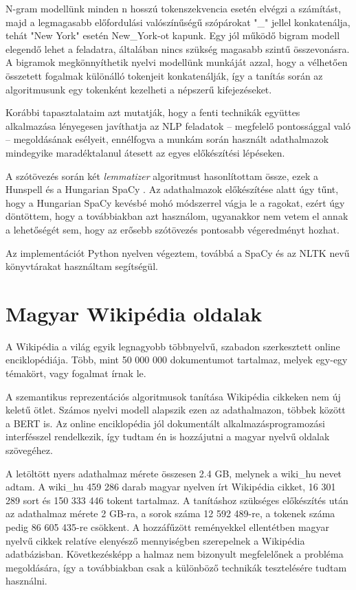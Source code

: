 N-gram modellünk minden n hosszú tokenszekvencia esetén elvégzi a számítást, majd a legmagasabb előfordulási valószínűségű szópárokat "\_" jellel konkatenálja, tehát "New York" esetén New\_York-ot kapunk. Egy jól működő bigram modell elegendő lehet a feladatra, általában nincs szükség magasabb szintű összevonásra. A bigramok megkönnyíthetik nyelvi modellünk munkáját azzal, hogy a vélhetően összetett fogalmak különálló tokenjeit konkatenálják, így a tanítás során az algoritmusunk egy tokenként kezelheti a népszerű kifejezéseket.

Korábbi tapasztalataim azt mutatják, hogy a fenti technikák együttes alkalmazása lényegesen javíthatja az NLP feladatok – megfelelő pontossággal való – megoldásának esélyeit, ennélfogva a munkám során használt adathalmazok mindegyike maradéktalanul átesett az egyes előkészítési lépéseken.

A szótövezés során két \textit{lemmatizer} algoritmust hasonlítottam össze, ezek a Hunspell \cite{hunspell} és a Hungarian SpaCy \cite{hunspacy}. Az adathalmazok előkészítése alatt úgy tűnt, hogy a Hungarian SpaCy kevésbé mohó módszerrel vágja le a ragokat, ezért úgy döntöttem, hogy a továbbiakban azt használom, ugyanakkor nem vetem el annak a lehetőségét sem, hogy az erősebb szótövezés pontosabb végeredményt hozhat. 

Az implementációt Python nyelven végeztem, továbbá a SpaCy \cite{spacy} és az NLTK \cite{nltk} nevű könyvtárakat használtam segítségül.

\section{Magyar Wikipédia oldalak}
A Wikipédia \cite{wikipedia} a világ egyik legnagyobb többnyelvű, szabadon szerkesztett online enciklopédiája. Több, mint 50 000 000 dokumentumot tartalmaz, melyek egy-egy témakört, vagy fogalmat írnak le.

A szemantikus reprezentációs algoritmusok tanítása Wikipédia cikkeken nem új keletű ötlet. Számos nyelvi modell alapszik ezen az adathalmazon, többek között a BERT is.
Az online enciklopédia jól dokumentált alkalmazásprogramozási interfésszel rendelkezik, így tudtam én is hozzájutni a magyar nyelvű oldalak szövegéhez.

A letöltött nyers adathalmaz mérete összesen 2.4 GB, melynek a wiki\_hu nevet adtam. A wiki\_hu 459 286 darab magyar nyelven írt Wikipédia cikket, 16 301 289 sort és 150 333 446 tokent tartalmaz. 
A tanításhoz szükséges előkészítés után az adathalmaz mérete 2 GB-ra, a sorok száma 12 592 489-re, a tokenek száma pedig 86 605 435-re csökkent.
A hozzáfűzött reményekkel ellentétben magyar nyelvű cikkek relatíve elenyésző mennyiségben szerepelnek a Wikipédia adatbázisban. Következésképp a halmaz nem bizonyult megfelelőnek a probléma megoldására, így a továbbiakban csak a különböző technikák tesztelésére tudtam használni.



